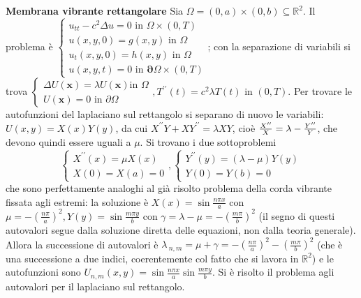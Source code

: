 \documentclass{article}
\begin{document}
\textbf{Membrana vibrante rettangolare} Sia $\Omega =\left( 0,a\right)
\times \left( 0,b\right) \subseteq 
\mathbb{R}
^{2}$. Il problema \`{e} $\left\{ 
\begin{array}{c}
u_{tt}-c^{2}\Delta u=0\text{ in }\Omega \times \left( 0,T\right) \\ 
u\left( x,y,0\right) =g\left( x,y\right) \text{ in }\Omega \\ 
u_{t}\left( x,y,0\right) =h\left( x,y\right) \text{ in }\Omega \\ 
u\left( x,y,t\right) =0\text{ in }\mathbf{\partial }\Omega \times \left(
0,T\right)%
\end{array}%
\right. $; con la separazione di variabili si trova $\left\{ 
\begin{array}{c}
\Delta U\left( \mathbf{x}\right) =\lambda U\left( \mathbf{x}\right) \text{
in }\Omega \\ 
U\left( \mathbf{x}\right) =0\text{ in }\partial \Omega%
\end{array}%
\right. ,T^{\prime \prime }\left( t\right) =c^{2}\lambda T\left( t\right) $
in $\left( 0,T\right) $. Per trovare le autofunzioni del laplaciano sul
rettangolo si separano di nuovo le variabili: $U\left( x,y\right) =X\left(
x\right) Y\left( y\right) $, da cui $X^{\prime \prime }Y+XY^{\prime \prime
}=\lambda XY$, cio\`{e} $\frac{X^{\prime \prime }}{X}=\lambda -\frac{%
Y^{\prime \prime }}{Y}$, che devono quindi essere uguali a $\mu $. Si
trovano i due sottoproblemi 
\begin{equation*}
\left\{ 
\begin{array}{c}
X^{\prime \prime }\left( x\right) =\mu X\left( x\right) \\ 
X\left( 0\right) =X\left( a\right) =0%
\end{array}%
\right. ,\left\{ 
\begin{array}{c}
Y^{\prime \prime }\left( y\right) =\left( \lambda -\mu \right) Y\left(
y\right) \\ 
Y\left( 0\right) =Y\left( b\right) =0%
\end{array}%
\right.
\end{equation*}
che sono perfettamente analoghi al gi\`{a} risolto problema della
corda vibrante fissata agli estremi: la soluzione \`{e} $X\left( x\right)
=\sin \frac{n\pi x}{a}$ con $\mu =-\left( \frac{n\pi }{a}\right)
^{2},Y\left( y\right) =\sin \frac{m\pi y}{b}$ con $\gamma =\lambda -\mu
=-\left( \frac{m\pi }{b}\right) ^{2}$ (il segno di questi autovalori segue
dalla soluzione diretta delle equazioni, non dalla teoria generale). Allora
la successione di autovalori \`{e} $\lambda \,_{n,m}=\mu +\gamma =-\left( 
\frac{n\pi }{a}\right) ^{2}-\left( \frac{m\pi }{b}\right) ^{2}$ (che \`{e}
una successione a due indici, coerentemente col fatto che si lavora in $%
\mathbb{R}
^{2}$) e le autofunzioni sono $U_{n,m}\left( x,y\right) =\sin \frac{n\pi x}{a%
}\sin \frac{m\pi y}{b}$. Si \`{e} risolto il problema agli autovalori per il
laplaciano sul rettangolo.
\end{document}
